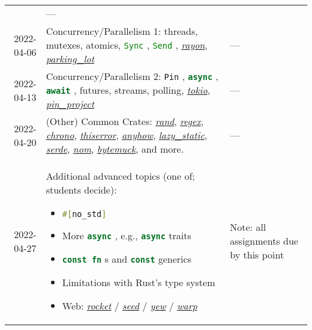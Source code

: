 \documentclass{article}
\newcommand{\code}[2][]{{\sloppy
\ifmmode
\text{\lstinline[language=rust,#1]`#2`}
\else
{\lstinline[language=rust,#1]`#2`}%
\fi}}
\begin{document}
\begin{longtable}{rp{}@{\hskip .05\textwidth}p{}}
                & ---                                                       \\
    2022-04-06  & Concurrency/Parallelism 1: threads, mutexes, atomics,
                  \code{Sync}, \code{Send},
                  \href{https://github.com/rayon-rs/rayon}{\textit{rayon}},
                  \href{https://github.com/Amanieu/parking_lot}{\textit{parking\_lot}}
                & ---                                                       \\
    2022-04-13  & Concurrency/Parallelism 2: \code{Pin}, \code{async},
                  \code{await}, futures, streams, polling,
                  \href{https://tokio.rs/}{\textit{tokio}},
                  \href{https://github.com/taiki-e/pin-project}{\textit{pin\_project}}
                & ---                                                       \\
    2022-04-20  & (Other) Common Crates:
                  \href{https://github.com/rust-random/rand}{\textit{rand}},
                  \href{https://github.com/rust-lang/regex}{\textit{regex}},
                  \href{https://github.com/chronotope/chrono}{\textit{chrono}},
                  \href{https://github.com/dtolnay/thiserror}{\textit{thiserror}},
                  \href{https://github.com/dtolnay/anyhow}{\textit{anyhow}},
                  \href{https://github.com/rust-lang-nursery/lazy-static.rs}{\textit{lazy\_static}}, 
                  \href{https://serde.rs/}{\textit{serde}},
                  \href{https://github.com/Geal/nom}{\textit{nom}},
                  \href{https://github.com/lokathor/bytemuck}{\textit{bytemuck}},
                  and more.
                & ---                                                       \\
    2022-04-27  & Additional advanced topics (one of; students decide):
                    \begin{itemize}
                        \item \code{#[no_std]}
                        \item More \code{async}, e.g., \code{async} traits
                        \item \code{const fn}s and \code{const} generics
                        \item Limitations with Rust's type system 
                        \item Web: 
                            \href{https://rocket.rs/}{\textit{rocket}} /
                            \href{https://seed-rs.org/}{\textit{seed}} /
                            \href{https://yew.rs/}{\textit{yew}} /
                            \href{https://github.com/seanmonstar/warp}{\textit{warp}}
                    \end{itemize}
                & Note: all assignments due by this point                   \\
    \bottomrule
\end{longtable}
\end{document}
